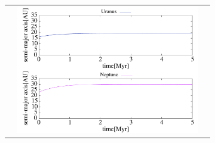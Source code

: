 \documentclass[11pt,a4paper,oneside,onecolumn]{jarticle}
\begin{document}
\begin{figure}[H]
\begin{tabular}{ccc}
\begin{minipage}[t]{0.1\hsize}
\end{minipage} &
\begin{minipage}[t]{0.45\hsize}
\centering
\includegraphics[width=8cm]{./image/Move500kyr_axis_5Myr_URANEP.pdf}
\end{minipage}
%
\end{tabular}
\caption{\label{}}
\end{figure}
\end{document}
